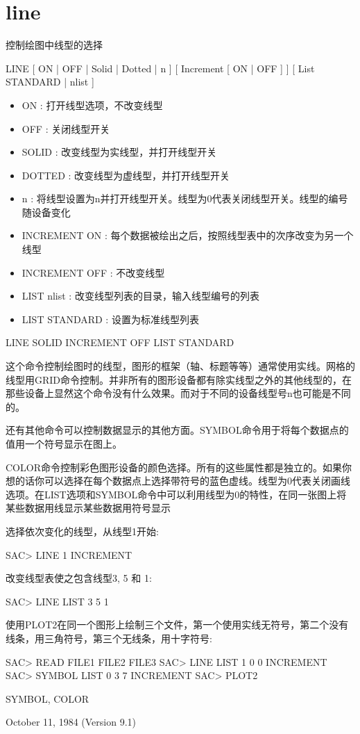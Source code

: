\section{line}
\label{cmd:line}

控制绘图中线型的选择

LINE [ ON | OFF | Solid | Dotted | n ] [ Increment [ ON | OFF ] ] [ List STANDARD | nlist ]

\begin{itemize}
\item ON : 打开线型选项，不改变线型 
\item OFF : 关闭线型开关 
\item SOLID : 改变线型为实线型，并打开线型开关 
\item DOTTED : 改变线型为虚线型，并打开线型开关 
\item n : 将线型设置为n并打开线型开关。线型为0代表关闭线型开关。线型的编号随设备变化 
\item INCREMENT {ON} : 每个数据被绘出之后，按照线型表中的次序改变为另一个线型 
\item INCREMENT OFF : 不改变线型 
\item LIST nlist : 改变线型列表的目录，输入线型编号的列表 
\item LIST STANDARD : 设置为标准线型列表 
\end{itemize}

LINE SOLID INCREMENT OFF LIST STANDARD

这个命令控制绘图时的线型，图形的框架（轴、标题等等）通常使用实线。网格的线型用GRID命令控制。并非所有的图形设备都有除实线型之外的其他线型的，在那些设备上显然这个命令没有什么效果。而对于不同的设备线型号n也可能是不同的。

还有其他命令可以控制数据显示的其他方面。SYMBOL命令用于将每个数据点的值用一个符号显示在图上。

COLOR命令控制彩色图形设备的颜色选择。所有的这些属性都是独立的。如果你想的话你可以选择在每个数据点上选择带符号的蓝色虚线。线型为0代表关闭画线选项。在LIST选项和SYMBOL命令中可以利用线型为0的特性，在同一张图上将某些数据用线显示某些数据用符号显示

选择依次变化的线型，从线型1开始:
\begin{SACCode}
SAC> LINE 1 INCREMENT
\end{SACCode}

改变线型表使之包含线型3, 5 和 1:
\begin{SACCode}
SAC> LINE LIST 3 5 1
\end{SACCode}

使用PLOT2在同一个图形上绘制三个文件，第一个使用实线无符号，第二个没有线条，用三角符号，第三个无线条，用十字符号:
\begin{SACCode}
SAC> READ FILE1 FILE2 FILE3
SAC> LINE LIST 1 0 0 INCREMENT
SAC> SYMBOL LIST 0 3 7 INCREMENT
SAC> PLOT2
\end{SACCode}

SYMBOL, COLOR

October 11, 1984 (Version 9.1)
